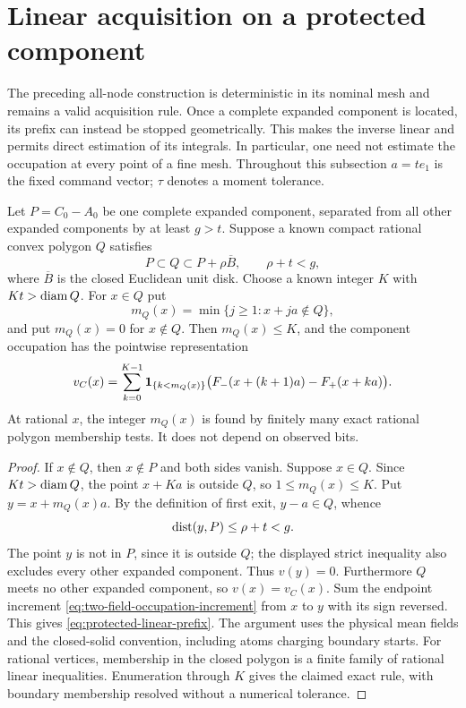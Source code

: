 \section{Linear acquisition on a protected component}
\label{sec:linear-moment-acquisition}
The preceding all-node construction is deterministic in its nominal
mesh and remains a valid acquisition rule. Once a complete expanded
component is located, its prefix can instead be stopped geometrically.
This makes the inverse linear and permits direct estimation of its
integrals. In particular, one need not estimate the occupation at
every point of a fine mesh. Throughout this subsection $a=te_1$ is
the fixed command vector; $\tau$ denotes a moment tolerance.

\begin{lemma}
\label{lem:protected-linear-prefix}
Let $P=C_0-A_0$ be one complete expanded component, separated from
all other expanded components by at least $g>t$. Suppose a known
compact rational convex polygon $Q$ satisfies
\begin{equation}\label{eq:protected-outer-polygon}
 P\subset Q\subset P+\rho\overline B,
                 \qquad \rho+t<g,
\end{equation}
where $\overline B$ is the closed Euclidean unit disk.
Choose a known integer $K$ with $Kt>\operatorname{diam} Q$. For $x\in Q$ put
\[
 m_Q(x)=\min\{j\ge1:x+ja\notin Q\},
\]
and put $m_Q(x)=0$ for $x\notin Q$. Then $m_Q(x)\le K$, and the
component occupation has the pointwise representation
\begin{equation}\label{eq:protected-linear-prefix}
 v_C(x)=\sum_{k=0}^{K-1}\mathbf 1_{\{k<m_Q(x)\}}
       \bigl(F_-(x+(k+1)a)-F_+(x+ka)\bigr).
\end{equation}
At rational $x$, the integer $m_Q(x)$ is found by finitely many exact
rational polygon membership tests. It does not depend on observed bits.
\end{lemma}
\begin{proof}
If $x\notin Q$, then $x\notin P$ and both sides vanish. Suppose
$x\in Q$. Since $Kt>\operatorname{diam} Q$, the point $x+Ka$ is outside $Q$,
so $1\le m_Q(x)\le K$. Put $y=x+m_Q(x)a$. By the definition of
first exit, $y-a\in Q$, whence
\[
                 \operatorname{dist}(y,P)\le\rho+t<g.
\]
The point $y$ is not in $P$, since it is outside $Q$; the displayed
strict inequality also excludes every other expanded component.
Thus $v(y)=0$. Furthermore $Q$ meets no other expanded component,
so $v(x)=v_C(x)$. Sum the endpoint increment
\eqref{eq:two-field-occupation-increment} from $x$ to $y$ with its
sign reversed. This gives \eqref{eq:protected-linear-prefix}.
The argument uses the physical mean fields and the closed-solid
convention, including atoms charging boundary starts. For rational
vertices, membership in the closed polygon is a finite family of
rational linear inequalities. Enumeration through $K$ gives the
claimed exact rule, with boundary membership resolved without a
numerical tolerance.
\end{proof}

